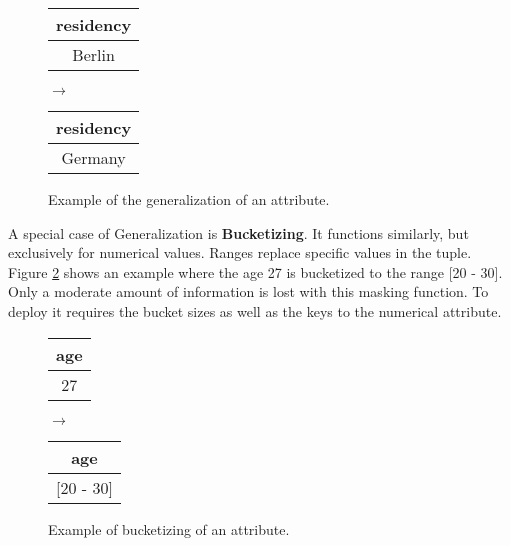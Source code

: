 \bigskip

\begin{figure}[ht]
    \begin{center}
    \footnotesize{
        \renewcommand{\arraystretch}{1.5}
        \begin{tabular}{|c|}
            \hline
            residency \\
            \hline
            Berlin \\
            \hline
            \end{tabular}
            \quad $\longrightarrow$ \quad
            \begin{tabular}{|c|}
            \hline
            residency \\
            \hline
            Germany \\
            \hline
        \end{tabular}
    }
    \end{center}
    \caption{Example of the generalization of an attribute.\label{fig:generalization}}
\end{figure}

A special case of Generalization is \textbf{Bucketizing}. It functions similarly, but exclusively for numerical values. Ranges replace specific values in the tuple. Figure \ref{fig:bucketizing} shows an example where the age 27 is bucketized to the range {[20 - 30]}. Only a moderate amount of information is lost with this masking function. To deploy it requires the bucket sizes as well as the keys to the numerical attribute. 

\bigskip

\begin{figure}[ht]
    \begin{center}
    \footnotesize{
        \renewcommand{\arraystretch}{1.5}
        \begin{tabular}{|c|}
            \hline
            age \\
            \hline
            27 \\
            \hline
            \end{tabular}
            \quad $\longrightarrow$ \quad
            \begin{tabular}{|c|}
            \hline
            age \\
            \hline
            {[20 - 30]} \\
            \hline
        \end{tabular}
    }
    \end{center}
    \caption{Example of bucketizing of an attribute.\label{fig:bucketizing}}
\end{figure}


